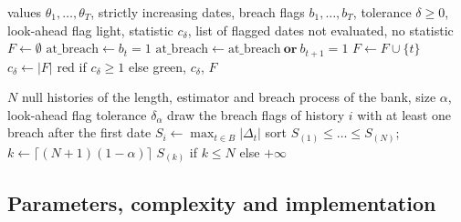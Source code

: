 \begin{algorithm}[htbp]
\caption{The coincidence test with an optional tolerance $\delta$ and an optional look-ahead.}
\label{alg:test}
\begin{algorithmic}[1]
\Require values $\theta_1,\dots,\theta_T$, strictly increasing dates, breach flags $b_1,\dots,b_T$, tolerance $\delta\ge 0$, look-ahead flag
\Ensure light, statistic $c_\delta$, list of flagged dates
 \State \Return not evaluated, no statistic \EndIf
\State $F\gets\emptyset$
  \State $\mathrm{at\_breach}\gets b_t=1$
   \State $\mathrm{at\_breach}\gets \mathrm{at\_breach}\ \textbf{or}\ b_{t+1}=1$ \EndIf
   \State $F\gets F\cup\{t\}$ \EndIf
\EndFor
\State $c_\delta\gets |F|$
\State \Return red if $c_\delta\ge 1$ else green, $c_\delta$, $F$
\end{algorithmic}
\end{algorithm}

\begin{algorithm}[htbp]
\caption{Calibration of the tolerance on a null population, for a false-flag rate $\alpha$.}
\label{alg:calibration}
\begin{algorithmic}[1]
\Require $N$ null histories of the length, estimator and breach process of the bank, size $\alpha$, look-ahead flag
\Ensure tolerance $\delta_\alpha$
  \State draw the breach flags of history $i$ with at least one breach after the first date
  \State $S_i\gets\max_{t\in B}|\Delta_t|$ 
\EndFor
\State sort $S_{(1)}\le\dots\le S_{(N)}$; $k\gets\lceil (N+1)(1-\alpha)\rceil$
\State \Return $S_{(k)}$ if $k\le N$ else $+\infty$
\end{algorithmic}
\end{algorithm}

\subsection{Parameters, complexity and implementation}
\label{sec:method-implementation}

